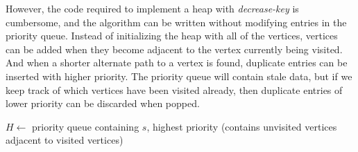 \documentclass[12pt, titlepage]{article}
\begin{document}
However, the code required to implement a heap with \textit{decrease-key} is cumbersome, and the algorithm can be written without modifying entries in the priority queue. Instead of initializing the heap with all of the vertices, vertices can be added when they become adjacent to the vertex currently being visited. And when a shorter alternate path to a vertex is found, duplicate entries can be inserted with higher priority. The priority queue will contain stale data, but if we keep track of which vertices have been visited already, then duplicate entries of lower priority can be discarded when popped. \\

\begin{algorithm}[H]
  \SetAlgoLined
  \DontPrintSemicolon

  $H \longleftarrow$\hspace{0.5mm} priority queue containing $s$, highest priority\;
  \hspace{13mm}(contains unvisited vertices adjacent to visited vertices)\;

  \;
    \caption{Dijkstra's Algorithm (heap with duplicate entries)}
\end{algorithm} \medskip
\end{document}
